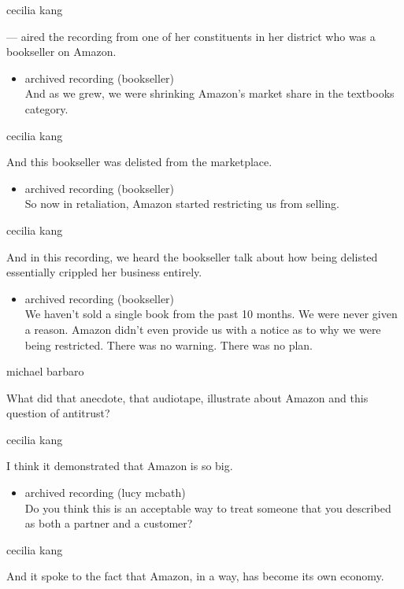 cecilia kang

--- aired the recording from one of her constituents in her district who
was a bookseller on Amazon.

\begin{itemize}
\tightlist
\item
  archived recording (bookseller)\\
  And as we grew, we were shrinking Amazon's market share in the
  textbooks category.
\end{itemize}

cecilia kang

And this bookseller was delisted from the marketplace.

\begin{itemize}
\tightlist
\item
  archived recording (bookseller)\\
  So now in retaliation, Amazon started restricting us from selling.
\end{itemize}

cecilia kang

And in this recording, we heard the bookseller talk about how being
delisted essentially crippled her business entirely.

\begin{itemize}
\tightlist
\item
  archived recording (bookseller)\\
  We haven't sold a single book from the past 10 months. We were never
  given a reason. Amazon didn't even provide us with a notice as to why
  we were being restricted. There was no warning. There was no plan.
\end{itemize}

michael barbaro

What did that anecdote, that audiotape, illustrate about Amazon and this
question of antitrust?

cecilia kang

I think it demonstrated that Amazon is so big.

\begin{itemize}
\tightlist
\item
  archived recording (lucy mcbath)\\
  Do you think this is an acceptable way to treat someone that you
  described as both a partner and a customer?
\end{itemize}

cecilia kang

And it spoke to the fact that Amazon, in a way, has become its own
economy.

